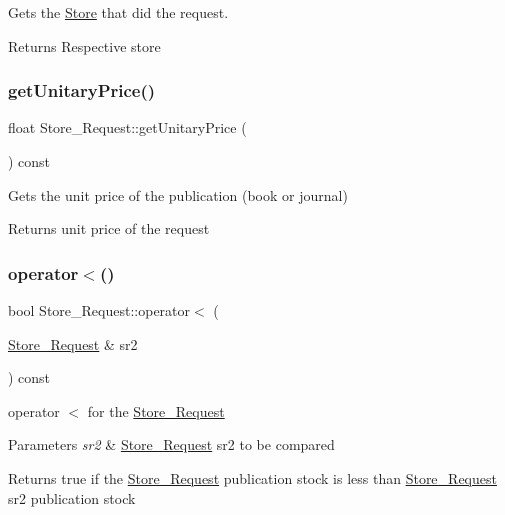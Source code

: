 Gets the \hyperlink{class_store}{Store} that did the request. 

\begin{DoxyReturn}{Returns}
Respective store 
\end{DoxyReturn}
\mbox{\label{class_store___request_a93fc46718e228136422fd03dd36032aa}} 
\subsubsection{\texorpdfstring{get\+Unitary\+Price()}{getUnitaryPrice()}}
{\footnotesize\ttfamily float Store\+\_\+\+Request\+::get\+Unitary\+Price (\begin{DoxyParamCaption}{ }\end{DoxyParamCaption}) const}



Gets the unit price of the publication (book or journal) 

\begin{DoxyReturn}{Returns}
unit price of the request 
\end{DoxyReturn}
\mbox{\label{class_store___request_a1536252134957a2d3bb9234822265b8d}} 
\subsubsection{\texorpdfstring{operator$<$()}{operator<()}}
{\footnotesize\ttfamily bool Store\+\_\+\+Request\+::operator$<$ (\begin{DoxyParamCaption}\item[{\hyperlink{class_store___request}{Store\+\_\+\+Request} \&}]{sr2 }\end{DoxyParamCaption}) const}



operator $<$ for the \hyperlink{class_store___request}{Store\+\_\+\+Request} 


\begin{DoxyParams}{Parameters}
{\em sr2} & \hyperlink{class_store___request}{Store\+\_\+\+Request} sr2 to be compared\\
\hline
\end{DoxyParams}
\begin{DoxyReturn}{Returns}
true if the \hyperlink{class_store___request}{Store\+\_\+\+Request} publication stock is less than \hyperlink{class_store___request}{Store\+\_\+\+Request} sr2 publication stock 
\end{DoxyReturn}
\mbox{\label{class_store___request_acaf1134a64475cff2641234e32b0b263}} 
